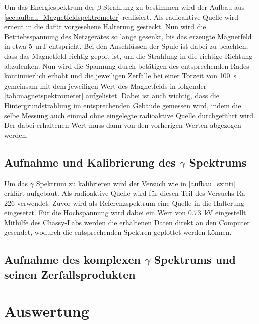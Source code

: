 \documentclass[12pt,english,ngerman]{scrartcl}
\begin{document}
Um das Energiespektrum der $\beta$ Strahlung zu bestimmen wird der Aufbau aus \autoref{sec:aufbau_Magnetfeldspektrometer} realisiert.
Als radioaktive Quelle wird erneut  in die dafür vorgesehene Halterung gesteckt. Nun wird die Betriebsspannung des
Netzgerätes so lange gesenkt, bis das erzeugte Magnetfeld in etwa \SI{5}{\milli\tesla} entspricht. Bei den Anschlüssen der 
Spule ist dabei zu beachten, dass das Magnetfeld richtig gepolt ist, um die Strahlung
in die richtige Richtung abzulenken. Nun wird die Spannung durch betätigen des entsprechenden Rades kontinuierlich erhöht
und die jeweiligen Zerfälle bei einer Torzeit von \SI{100}{\second} gemeinsam mit dem jeweiligen Wert des Magnetfelds in folgender
\autoref{tab:magnetspektrometer} aufgelistet. Dabei ist auch wichtig, dass die Hintergrundstrahlung im entsprechenden Gebäude
gemessen wird, indem die selbe Messung auch einmal ohne eingelegte radioaktive Quelle durchgeführt wird. Der dabei erhaltenen
Wert muss dann von den vorherigen Werten abgezogen werden.


\subsection{Aufnahme und Kalibrierung des \texorpdfstring{$\gamma$}{gamma} Spektrums}

Um das $\gamma$ Spektrum zu kalibrieren wird der Versuch wie in \autoref{aufbau_szinti} erklärt aufgebaut. Als radioaktive
Quelle wird für diesen Teil des Versuchs Ra-226 verwendet. Zuvor wird als Referenzspektrum eine  Quelle in die Halterung
eingesetzt. Für die Hochspannung wird dabei ein Wert von \SI{0.73}{\kilo\volt} eingestellt.
Mithilfe des Chassy-Labs werden die erhaltenen Daten direkt an den Computer gesendet, wodurch die entsprechenden Spektren geplottet
werden können.

\subsection{Aufnahme des komplexen \texorpdfstring{$\gamma$}{gamma} Spektrums und seinen Zerfallsprodukten}








\section{Auswertung}\label{sec:Auswertung}
\end{document}
